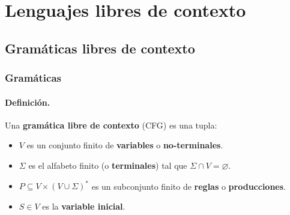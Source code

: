 \section{Lenguajes libres de contexto}

\subsection{Gramáticas libres de contexto}

\subsubsection{Gramáticas}

\paragraph{Definición.} Una \textbf{gramática libre de contexto} (CFG) es una tupla:
\begin{itemize}
    \item $V$ es un conjunto finito de \textbf{variables} o \textbf{no-terminales}.
    \item $\Sigma$ es el alfabeto finito (o \textbf{terminales}) tal que $\Sigma \cap V = \varnothing$.
    \item $P \subseteq V \times(V \cup \Sigma)^*$ es un subconjunto finito de \textbf{reglas} o \textbf{producciones}.
    \item $S \in V$ es la \textbf{variable inicial}.
\end{itemize}


